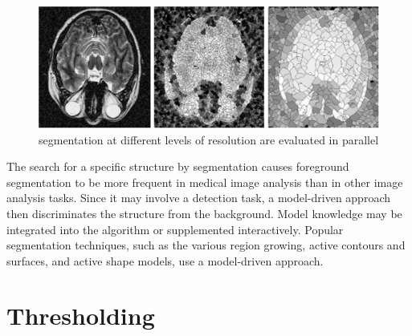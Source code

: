 \begin{figure}[htbp]
	\centering \includegraphics[width=0.55\columnwidth]{./figures/Fig19.png}
	\caption{segmentation at different levels of resolution are evaluated in parallel}
	\label{fig19}
\end{figure}

The search for a specific structure by segmentation causes foreground segmentation to be more frequent in medical image analysis than in other image analysis tasks. Since it may involve a detection task, a model-driven approach then discriminates the structure from the background. Model knowledge may be integrated into the algorithm or supplemented interactively. Popular segmentation techniques, such as the various region growing, active contours and surfaces, and active shape models, use a model-driven approach.

\section{Thresholding}

